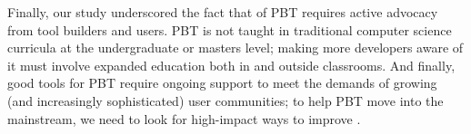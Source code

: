 Finally, our study underscored the fact that  of PBT
requires active advocacy from tool builders and users. PBT is
not taught in traditional computer science curricula at the
undergraduate or masters level; making more developers aware of it
must involve expanded education both in and outside classrooms.
%
And finally, good tools for PBT require ongoing support to meet
the demands of growing (and increasingly sophisticated) user communities; to
help PBT move into the mainstream, we need to look for high-impact ways
to improve .




